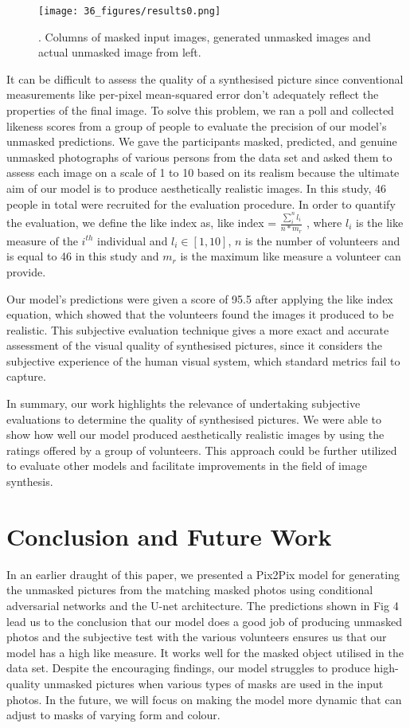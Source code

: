 \documentclass{36_styles/svproc}
\begin{document}
\begin{figure}[ht]%
\centering
\texttt{[image: 36\_figures/results0.png]}
\caption{. Columns of masked input images, generated unmasked images and actual unmasked image from left.}\label{fig4}
\end{figure}

It can be difficult to assess the quality of a synthesised picture \cite{zhang2016colorful} since conventional measurements like per-pixel mean-squared error don't adequately reflect the properties of the final image. To solve this problem, we ran a poll and collected likeness scores from a group of people to evaluate the precision of our model's unmasked predictions. We gave the participants masked, predicted, and genuine unmasked photographs of various persons from the data set and asked them to assess each image on a scale of 1 to 10 based on its realism because the ultimate aim of our model is to produce aesthetically realistic images. In this study, 46 people in total were recruited for the evaluation procedure.
In order to quantify the evaluation, we define the like index as, like index = $\frac{\sum_{i}^{n}l_i}{n\ast m_r}$ , where $l_i$ is the like measure of the $i^{th}$ individual and $l_i \in [1, 10]$, $n$ is the number of volunteers and is equal to 46 in this study and $m_r$  is the maximum like measure a volunteer can provide. 

Our model's predictions were given a score of 95.5 after applying the like index equation, which showed that the volunteers found the images it produced to be realistic. This subjective evaluation technique gives a more exact and accurate assessment of the visual quality of synthesised pictures, since it considers the subjective experience of the human visual system, which standard metrics fail to capture. 

In summary, our work highlights the relevance of undertaking subjective evaluations to determine the quality of synthesised pictures. We were able to show how well our model produced aesthetically realistic images by using the ratings offered by a group of volunteers. This approach could be further utilized to evaluate other models and facilitate improvements in the field of image synthesis.

\section{Conclusion and Future Work}

In an earlier draught of this paper, we presented a Pix2Pix model for generating the unmasked pictures from the matching masked photos using conditional adversarial networks and the U-net architecture. The predictions shown in Fig 4 lead us to the conclusion that our model does a good job of producing unmasked photos and the subjective test with the various volunteers ensures us that our model has a high like measure. It works well for the masked object utilised in the data set. Despite the encouraging findings, our model struggles to produce high-quality unmasked pictures when various types of masks are used in the input photos. In the future, we will focus on making the model more dynamic that can adjust to masks of varying form and colour.
\end{document}
